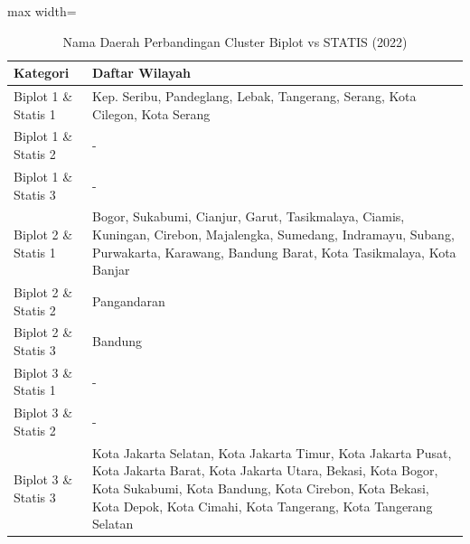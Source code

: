 \begin{table}[H]
\centering
\caption{Nama Daerah Perbandingan Cluster Biplot vs STATIS (2022)} \label{tab:appbiplot_statis_comp_name_2022}
\begin{adjustbox}{max width=\textwidth}
\begin{tabular}{|p{4cm}|p{10cm}|}
\hline
\textbf{Kategori} & \textbf{Daftar Wilayah} \\
\hline
Biplot 1 \& Statis 1 & Kep. Seribu, Pandeglang, Lebak, Tangerang, Serang, Kota Cilegon, Kota Serang \\
\hline
Biplot 1 \& Statis 2 & - \\
\hline
Biplot 1 \& Statis 3 & - \\
\hline
Biplot 2 \& Statis 1 & Bogor, Sukabumi, Cianjur, Garut, Tasikmalaya, Ciamis, Kuningan, Cirebon, Majalengka, Sumedang, Indramayu, Subang, Purwakarta, Karawang, Bandung Barat, Kota Tasikmalaya, Kota Banjar \\
\hline
Biplot 2 \& Statis 2 & Pangandaran \\
\hline
Biplot 2 \& Statis 3 & Bandung \\
\hline
Biplot 3 \& Statis 1 & - \\
\hline
Biplot 3 \& Statis 2 & - \\
\hline
Biplot 3 \& Statis 3 & Kota Jakarta Selatan, Kota Jakarta Timur, Kota Jakarta Pusat, Kota Jakarta Barat, Kota Jakarta Utara, Bekasi, Kota Bogor, Kota Sukabumi, Kota Bandung, Kota Cirebon, Kota Bekasi, Kota Depok, Kota Cimahi, Kota Tangerang, Kota Tangerang Selatan \\
\hline
\end{tabular}
\end{adjustbox}
\end{table}